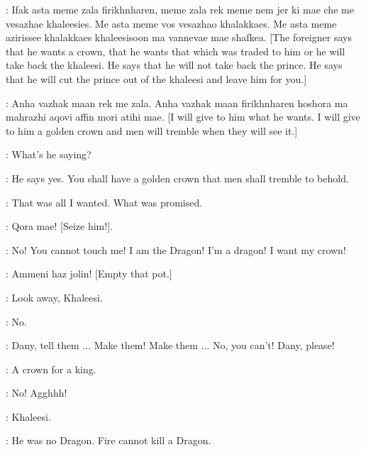 \IRRI: Ifak asta meme zala firikhnharen, meme zala rek meme nem jer ki mae che me vesazhae khaleesies. Me asta meme vos vesazhao khalakkaes. Me asta meme azirissee khalakkaes khaleesisoon ma vannevae mae shafkea. [The foreigner says that he wants a crown, that he wants that which was traded to him or he will take back the khaleesi. He says that he will not take back the prince. He says that he will cut the prince out of the khaleesi and leave him for you.] 

\DROGO: Anha vazhak maan rek me zala. Anha vazhak maan firikhnharen hoshora ma mahrazhi aqovi affin mori atihi mae. [I will give to him what he wants. I will give to him a golden crown and men will tremble when they will see it.] 

\VISERYS: What's he saying? 

\DAENERYS: He says yes. You shall have a golden crown that men shall tremble to behold. 

\VISERYS: That was all I wanted. What was promised. 

\DROGO: Qora mae! [Seize him!]. 


\VISERYS:  No! You cannot touch me! I am the Dragon! I'm a dragon! I want my crown! 

\DROGO: Ammeni haz jolin! [Empty that pot.] 


\JORAH: Look away, Khaleesi. 

\DAENERYS: No. 

\VISERYS: Dany, tell them $\ldots$ Make them! Make them $\ldots$ No, you can't! Dany, please! 


\DROGO: A crown for a king. 


\VISERYS: No! Agghhh! 


\JORAH: Khaleesi. 

\DAENERYS: He was no Dragon. Fire cannot kill a Dragon. 



